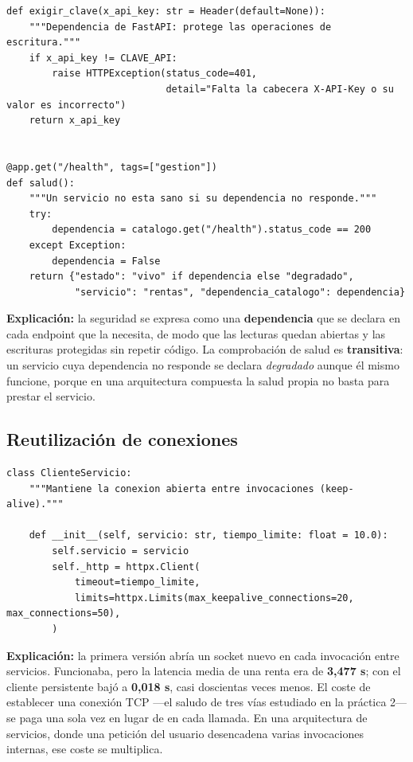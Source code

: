\documentclass[12pt]{article}
\begin{document}
\begin{lstlisting}[caption={Seguridad y gestión (comun.py y rentas.py)}]
def exigir_clave(x_api_key: str = Header(default=None)):
    """Dependencia de FastAPI: protege las operaciones de escritura."""
    if x_api_key != CLAVE_API:
        raise HTTPException(status_code=401,
                            detail="Falta la cabecera X-API-Key o su valor es incorrecto")
    return x_api_key


@app.get("/health", tags=["gestion"])
def salud():
    """Un servicio no esta sano si su dependencia no responde."""
    try:
        dependencia = catalogo.get("/health").status_code == 200
    except Exception:
        dependencia = False
    return {"estado": "vivo" if dependencia else "degradado",
            "servicio": "rentas", "dependencia_catalogo": dependencia}
\end{lstlisting}

\noindent\textbf{Explicación:} la seguridad se expresa como una \textbf{dependencia} que se declara en cada endpoint que la necesita, de modo que las lecturas quedan abiertas y las escrituras protegidas sin repetir código. La comprobación de salud es \textbf{transitiva}: un servicio cuya dependencia no responde se declara \textit{degradado} aunque él mismo funcione, porque en una arquitectura compuesta la salud propia no basta para prestar el servicio.

\subsection{Reutilización de conexiones}

\begin{lstlisting}[caption={Cliente HTTP persistente entre servicios (comun.py)}]
class ClienteServicio:
    """Mantiene la conexion abierta entre invocaciones (keep-alive)."""

    def __init__(self, servicio: str, tiempo_limite: float = 10.0):
        self.servicio = servicio
        self._http = httpx.Client(
            timeout=tiempo_limite,
            limits=httpx.Limits(max_keepalive_connections=20, max_connections=50),
        )
\end{lstlisting}

\noindent\textbf{Explicación:} la primera versión abría un socket nuevo en cada invocación entre servicios. Funcionaba, pero la latencia media de una renta era de \textbf{3,477 s}; con el cliente persistente bajó a \textbf{0,018 s}, casi doscientas veces menos. El coste de establecer una conexión TCP —el saludo de tres vías estudiado en la práctica 2— se paga una sola vez en lugar de en cada llamada. En una arquitectura de servicios, donde una petición del usuario desencadena varias invocaciones internas, ese coste se multiplica.
\end{document}
